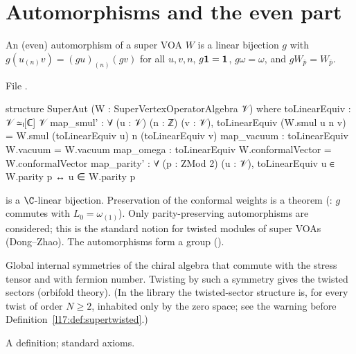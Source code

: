 \section{Automorphisms and the even part}\label{l17:sec:aut}

\begin{definition}\label{l17:def:superaut}
An (even) automorphism of a super VOA $W$ is a linear bijection $g$ with
$g(u_{(n)}v)=(gu)_{(n)}(gv)$ for all $u,v,n$, $g\mathbf{1}=\mathbf{1}$, $g\omega=\omega$, and
$gW_{\bar p}=W_{\bar p}$.
\end{definition}
\noindent File .
\begin{leancode}
structure SuperAut (W : SuperVertexOperatorAlgebra 𝒱) where
  toLinearEquiv : 𝒱 ≃ₗ[ℂ] 𝒱
  map_smul' : ∀ (u : 𝒱) (n : ℤ) (v : 𝒱),
    toLinearEquiv (W.smul u n v) = W.smul (toLinearEquiv u) n (toLinearEquiv v)
  map_vacuum : toLinearEquiv W.vacuum = W.vacuum
  map_omega : toLinearEquiv W.conformalVector = W.conformalVector
  map_parity' : ∀ (p : ZMod 2) (u : 𝒱),
    toLinearEquiv u ∈ W.parity p ↔ u ∈ W.parity p
\end{leancode}
\begin{dictionary}
 is a $\C$-linear bijection. Preservation of the conformal weights is a theorem
(: $g$ commutes with $L_0=\omega_{(1)}$). Only parity-preserving automorphisms
are considered; this is the standard notion for twisted modules of super VOAs (Dong--Zhao). The
automorphisms form a group ().
\end{dictionary}
\begin{physics}
Global internal symmetries of the chiral algebra that commute with the stress tensor and with
fermion number. Twisting by such a symmetry gives the twisted sectors (orbifold theory). (In the
library the twisted-sector structure  is, for every twist of order $N\ge2$,
inhabited only by the zero space; see the warning before Definition~\ref{l17:def:supertwisted}.)
\end{physics}
\begin{status}
A definition; standard axioms.
\end{status}

